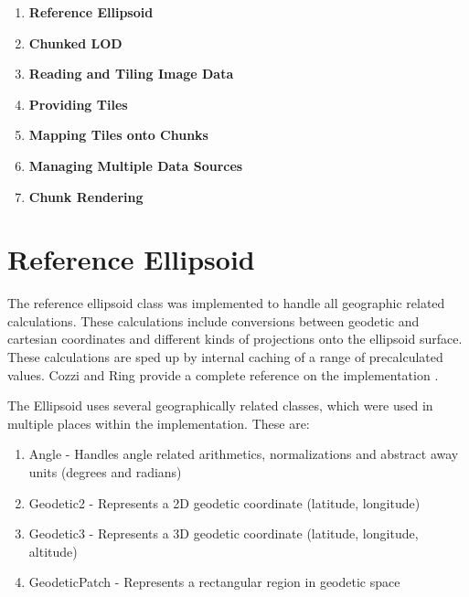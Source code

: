 \begin{enumerate}
	\item \textbf{Reference Ellipsoid}%
	\item \textbf{Chunked LOD}%
	\item \textbf{Reading and Tiling Image Data}%
	\item \textbf{Providing Tiles}%
	\item \textbf{Mapping Tiles onto Chunks}%
	\item \textbf{Managing Multiple Data Sources}%
	\item \textbf{Chunk Rendering}%
\end{enumerate}



\section{Reference Ellipsoid}
The reference ellipsoid class was implemented to handle all geographic related calculations.  These calculations include conversions between geodetic and cartesian coordinates and different kinds of projections onto the ellipsoid surface. These calculations are sped up by internal caching of a range of precalculated values. Cozzi and Ring provide a complete reference on the implementation \cite[p. 17]{cozzi11}.

The Ellipsoid uses several geographically related classes, which were used in multiple places within the implementation. These are:
\begin{enumerate}
	\item Angle - Handles angle related arithmetics, normalizations and abstract away units (degrees and radians)
	\item Geodetic2 - Represents a 2D geodetic coordinate (latitude, longitude)
	\item Geodetic3 - Represents a 3D geodetic coordinate (latitude, longitude, altitude)
	\item GeodeticPatch - Represents a rectangular region in geodetic space
\end{enumerate}

